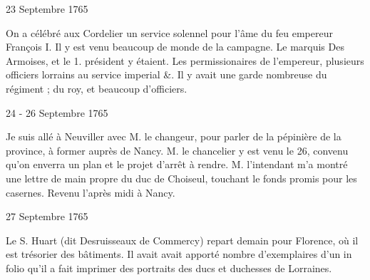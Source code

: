                      \begin{diary}{23 Septembre 1765}{}

                         On a célébré aux Cordelier un service solennel
                           pour l'âme du feu empereur
                              François I. Il y est
                           venu beaucoup de monde de la campagne. Le
                              marquis Des Armoises, et le 1. président y étaient. Les
                           permissionaires de l'empereur, plusieurs officiers lorrains
                           au service imperial \&. Il y avait une garde
                           nombreuse du régiment ; du roy, et beaucoup d'officiers. \bigskip


                     \end{diary}

                     \begin{diary}{24 - 26 Septembre 1765}{}

                         Je suis allé à Neuviller avec M. le changeur, pour
                           parler de la pépinière de la
                              province, à former
                           auprès de Nancy. M. le chancelier y est venu
                           le 26, convenu qu'on enverra un plan
                           et le
                           projet d'arrêt à rendre. M.
                              l'intendant m'a montré
                           une lettre de main propre du duc de
                              Choiseul,
                           touchant le fonds promis pour les casernes. Revenu l'après midi à Nancy. \bigskip


                     \end{diary}

                     \begin{diary}{27 Septembre 1765}{}


                           Le S. Huart (dit Desruisseaux de
                              Commercy)
                           repart demain pour Florence,
                           où il est
                           trésorier des bâtiments. Il avait avait
                           apporté
                           nombre d'exemplaires d'un in folio qu'il a fait
                           imprimer des portraits des ducs et duchesses
                           de Lorraines. \bigskip


                     \end{diary}
